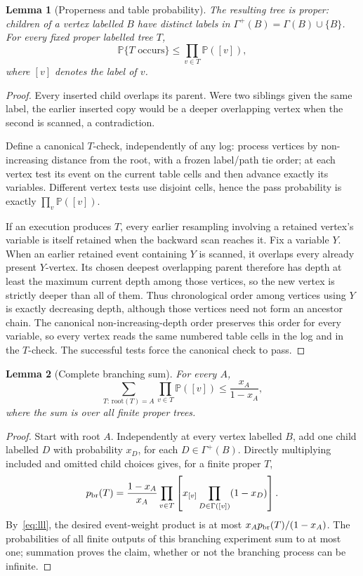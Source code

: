 \documentclass[10pt]{article}
\newtheorem{lemma}{Lemma}
\newcommand{\Prob}{\mathbb P}
\begin{document}
\begin{lemma}[Properness and table probability]\label{lem:witness}
The resulting tree is proper: children of a vertex labelled $B$ have distinct
labels in $\Gamma^+(B)=\Gamma(B)\cup\{B\}$.  For every fixed proper labelled tree
$T$,
\[
 \Prob\{T\text{ occurs}\}\le\prod_{v\in T}\Prob([v]),
\]
where $[v]$ denotes the label of $v$.
\end{lemma}
\begin{proof}
Every inserted child overlaps its parent.  Were two siblings given the same
label, the earlier inserted copy would be a deeper overlapping vertex when the
second is scanned, a contradiction.

Define a canonical $T$-check, independently of any log: process vertices by
non-increasing distance from the root, with a frozen label/path tie order; at
each vertex test its event on the current table cells and then advance exactly
its variables.  Different vertex tests use disjoint cells, hence the pass
probability is exactly $\prod_v\Prob([v])$.

If an execution produces $T$, every earlier resampling involving a retained
vertex's variable is itself retained when the backward scan reaches it.
Fix a variable $Y$.  When an earlier retained event containing $Y$ is scanned,
it overlaps every already present $Y$-vertex.  Its chosen deepest overlapping
parent therefore has depth at least the maximum current depth among those
vertices, so the new vertex is strictly deeper than all of them.  Thus
chronological order among vertices using $Y$ is exactly decreasing depth,
although those vertices need not form an ancestor chain.  The canonical
non-increasing-depth order preserves this order for every variable, so every
vertex reads the same numbered table cells in the log and in the $T$-check.
The successful tests force the canonical check to pass.
\end{proof}

\begin{lemma}[Complete branching sum]\label{lem:branch}
For every $A$,
\[
 \sum_{T:\,\mathrm{root}(T)=A}\prod_{v\in T}\Prob([v])
 \le \frac{x_A}{1-x_A},
\]
where the sum is over all finite proper trees.
\end{lemma}
\begin{proof}
Start with root $A$.  Independently at every vertex labelled $B$, add one child
labelled $D$ with probability $x_D$, for each $D\in\Gamma^+(B)$.  Directly
multiplying included and omitted child choices gives, for a finite proper $T$,
\[
 p_{\rm br}(T)=\frac{1-x_A}{x_A}
 \prod_{v\in T}\left[x_{[v]}\prod_{D\in\Gamma([v])}(1-x_D)\right].
\]
By~\eqref{eq:lll}, the desired event-weight product is at most
$x_Ap_{\rm br}(T)/(1-x_A)$.  The probabilities of all finite outputs of this
branching experiment sum to at most one; summation proves the claim, whether or
not the branching process can be infinite.
\end{proof}
\end{document}
